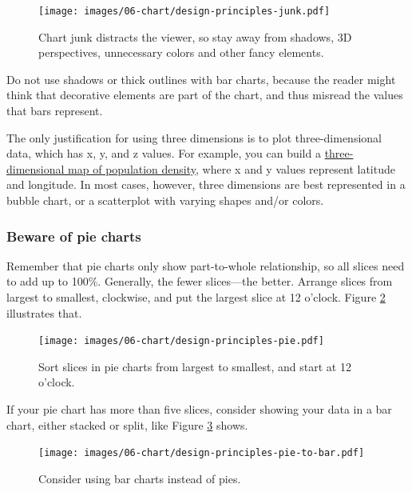 \documentclass[
  english,
]{book}
\begin{document}
\begin{figure}
\centering
\texttt{[image: images/06-chart/design-principles-junk.pdf]}
\caption{\label{fig:design-principles-junk}Chart junk distracts the viewer, so stay away from shadows, 3D perspectives, unnecessary colors and other fancy elements.}
\end{figure}

Do not use shadows or thick outlines with bar charts, because the reader might think
that decorative elements are part of the chart, and thus misread the
values that bars represent.

The only justification for using three dimensions is to plot three-dimensional data,
which has x, y, and z values. For example, you can build a \href{https://blog.mapbox.com/3d-mapping-global-population-density-how-i-built-it-141785c91107}{three-dimensional map of
population density},
where x and y values represent latitude and longitude. In most cases, however,
three dimensions are best represented in a bubble chart, or a scatterplot
with varying shapes and/or colors.

\hypertarget{beware-of-pie-charts}{%
\subsubsection*{Beware of pie charts}\label{beware-of-pie-charts}}

Remember that pie charts only show part-to-whole relationship, so all slices need to add up to 100\%. Generally, the fewer slices---the better. Arrange slices from largest
to smallest, clockwise, and put the largest slice at 12 o'clock.
Figure \ref{fig:design-principles-pie} illustrates that.



\begin{figure}
\centering
\texttt{[image: images/06-chart/design-principles-pie.pdf]}
\caption{\label{fig:design-principles-pie}Sort slices in pie charts from largest to smallest, and start at 12 o'clock.}
\end{figure}

If your pie chart has more than five slices, consider showing your data in a bar chart, either stacked or split, like Figure \ref{fig:design-principles-pie-to-bar} shows.



\begin{figure}
\centering
\texttt{[image: images/06-chart/design-principles-pie-to-bar.pdf]}
\caption{\label{fig:design-principles-pie-to-bar}Consider using bar charts instead of pies.}
\end{figure}
\end{document}
